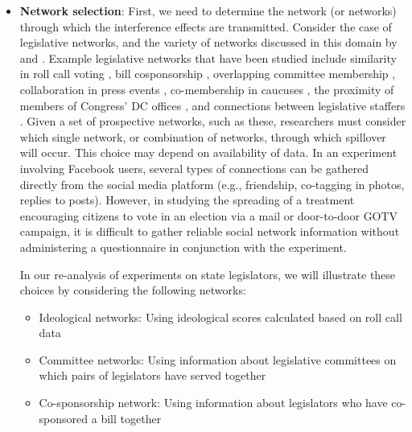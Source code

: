 \documentclass[12pt]{article}
\begin{document}
\begin{itemize}

\item \textbf{Network selection}:
First, we need to determine the network (or networks) through which the interference effects are transmitted. Consider the case of legislative networks, and the variety of networks discussed in this domain by \citet{kirkland2014measurement} and \cite{desmarais2015measuring}. Example legislative networks that have been studied include similarity in roll call voting \citep{kim2012comparing}, bill cosponsorship \citep{fowler2006connecting}, overlapping committee membership \citep{porter2005network}, collaboration in press events \citep{desmarais2015measuring}, co-membership in caucuses \citep{victor2009social}, the proximity of members of Congress' DC offices \citep{rogowski2012estimating}, and connections between legislative staffers \citep{ringe2013keeping}. Given a set of prospective networks, such as these, researchers must consider which single network, or combination of networks, through which spillover will occur. This choice may depend on availability of data. In an experiment involving Facebook users, several types of connections can be gathered directly from the social media platform (e.g., friendship, co-tagging in photos, replies to posts). However, in studying the spreading of a treatment encouraging citizens to vote in an election via a mail or door-to-door GOTV campaign, it is difficult to gather reliable social network information without administering a questionnaire in conjunction with the experiment.

In our re-analysis of experiments on state legislators, we will illustrate these choices by considering the following networks:
\begin{itemize}
\item Ideological networks: Using ideological scores calculated based on roll call data
\item Committee networks: Using information about legislative committees on which pairs of legislators have served together
\item Co-sponsorship network: Using information about legislators who have co-sponsored a bill together
\end{itemize}



\end{itemize}
\end{document}
